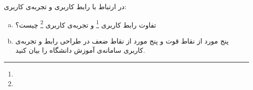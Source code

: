 در ارتباط با رابط کاربری و تجربه‌ی کاربری:
\begin{enumerate}[a)]
	\item 
تفاوت رابط کاربری \footnote{} و تجربه‌ی کاربری \footnote{} چیست؟
	\item 
پنج مورد از نقاط قوت و پنج مورد از نقاط ضعف در طراحی رابط و تجربه‌ی کاربری سامانه‌ی آموزش دانشگاه را بیان کنید.‌
\end{enumerate}


